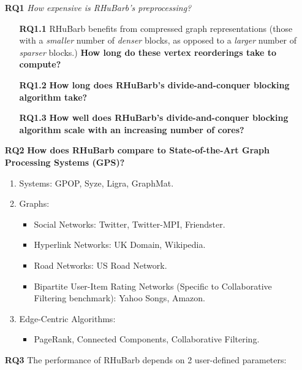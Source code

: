 \begin{itemize}
    \item [\textbf{RQ1}] \textit{How expensive is RHuBarb's preprocessing?}
          \begin{itemize}
              \item [\textbf{RQ1.1}] RHuBarb benefits from compressed graph representations (those with a \textit{smaller} number of \textit{denser} blocks, as opposed to a \textit{larger} number of \textit{sparser} blocks.) \textbf{How long do these vertex reorderings take to compute?}
              \item [\textbf{RQ1.2}]{ \textbf{How long does RHuBarb's divide-and-conquer blocking algorithm take?}}
              \item [\textbf{RQ1.3}] \textbf{How well does RHuBarb's divide-and-conquer blocking algorithm scale with an increasing number of cores?}
          \end{itemize}
    \item [\textbf{RQ2}] \textbf{How does RHuBarb compare to State-of-the-Art Graph Processing Systems (GPS)?}
          \begin{enumerate}
              \item Systems: GPOP, Syze, Ligra, GraphMat.
              \item Graphs:
                    \begin{itemize}
                        \item Social Networks: Twitter, Twitter-MPI, Friendster.
                        \item Hyperlink Networks: UK Domain, Wikipedia.
                        \item Road Networks: US Road Network.
                        \item Bipartite User-Item Rating Networks (Specific to Collaborative Filtering benchmark): Yahoo Songs, Amazon.
                    \end{itemize}
              \item Edge-Centric Algorithms:
                    \begin{itemize}
                        \item PageRank, Connected Components, Collaborative Filtering.
                    \end{itemize}
          \end{enumerate}
    \item [\textbf{RQ3}] The performance of RHuBarb depends on 2 user-defined parameters:

\end{itemize}
